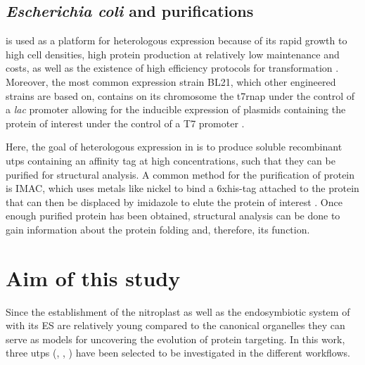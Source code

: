 \subsection{\textit{Escherichia coli} and purifications}
 is used as a platform for heterologous expression because of its rapid growth to high cell densities, high protein production at relatively low maintenance and costs, as well as the existence of high efficiency protocols for transformation \parencite{sezonov_escherichia_2007, shiloach_growing_2005, rosano_recombinant_2014}. Moreover, the most common expression strain BL21, which other engineered strains are based on, contains on its chromosome the \gls{t7rnap} under the control of a \textit{lac} promoter allowing for the inducible expression of plasmids containing the protein of interest under the control of a T7 promoter \parencite{rosano_recombinant_2014, terpe_overview_2006, studier_use_1986}.

Here, the goal of heterologous expression in  is to produce soluble recombinant \gls{utp}s containing an affinity tag at high concentrations, such that they can be purified for structural analysis. A common method for the purification of protein is \gls{IMAC}, which uses metals like nickel to bind a \gls{6xhis}-tag attached to the protein that can then be displaced by imidazole to elute the protein of interest \parencite{porath_immobilized_1992}. Once enough purified protein has been obtained, structural analysis can be done to gain information about the protein folding and, therefore, its function.
\section{Aim of this study}
Since the establishment of the nitroplast as well as the endosymbiotic system of  with its \gls{ES} are relatively young compared to the canonical organelles they can serve as models for uncovering the evolution of protein targeting. In this work, three \gls{utp}s (, , ) have been selected to be investigated in the different workflows.

